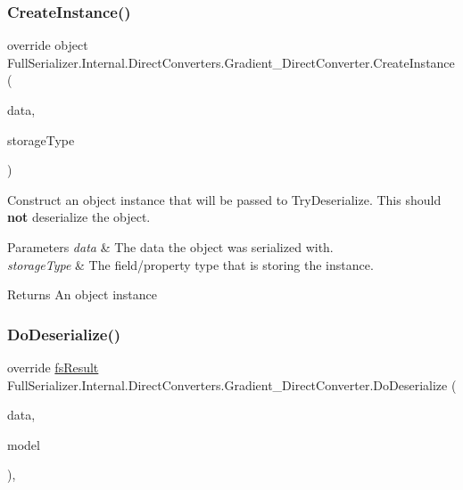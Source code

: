 \subsubsection{\texorpdfstring{Create\+Instance()}{CreateInstance()}}
{\footnotesize\ttfamily override object Full\+Serializer.\+Internal.\+Direct\+Converters.\+Gradient\+\_\+\+Direct\+Converter.\+Create\+Instance (\begin{DoxyParamCaption}\item[{\hyperlink{class_full_serializer_1_1fs_data}{fs\+Data}}]{data,  }\item[{Type}]{storage\+Type }\end{DoxyParamCaption})\hspace{0.3cm}{\ttfamily [inline]}}



Construct an object instance that will be passed to Try\+Deserialize. This should {\bfseries not} deserialize the object. 


\begin{DoxyParams}{Parameters}
{\em data} & The data the object was serialized with.\\
\hline
{\em storage\+Type} & The field/property type that is storing the instance.\\
\hline
\end{DoxyParams}
\begin{DoxyReturn}{Returns}
An object instance
\end{DoxyReturn}
\mbox{\label{class_full_serializer_1_1_internal_1_1_direct_converters_1_1_gradient___direct_converter_a73df87f1f589a688bbf15bf41f8e6f25}} 
\subsubsection{\texorpdfstring{Do\+Deserialize()}{DoDeserialize()}}
{\footnotesize\ttfamily override \hyperlink{struct_full_serializer_1_1fs_result}{fs\+Result} Full\+Serializer.\+Internal.\+Direct\+Converters.\+Gradient\+\_\+\+Direct\+Converter.\+Do\+Deserialize (\begin{DoxyParamCaption}\item[{Dictionary$<$ string, \hyperlink{class_full_serializer_1_1fs_data}{fs\+Data} $>$}]{data,  }\item[{ref Gradient}]{model }\end{DoxyParamCaption})\hspace{0.3cm}{\ttfamily [inline]}, {\ttfamily [protected]}}



